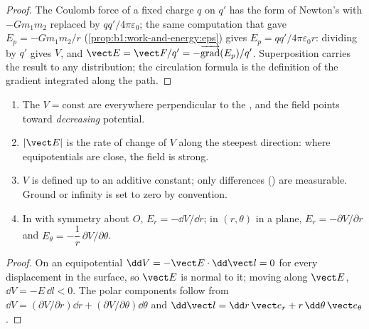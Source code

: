 \begin{proof}
The Coulomb force of a fixed charge $q$ on $q'$ has the form of Newton's
 with $-Gm_1m_2$ replaced by $qq'/4\pi\varepsilon_0$; the same
computation that gave $E_p = -Gm_1m_2/r$
(\cref{prop:b1:work-and-energy:eps}) gives $E_p = qq'/4\pi\varepsilon_0r$:
dividing by $q'$ gives $V$, and $\vect E = \vect F/q' =
-\overrightarrow{\operatorname{grad}}(E_p)/q'$. Superposition carries the
result to any distribution; the circulation formula is the definition
of the gradient integrated along the path.
\end{proof}

\begin{proposition}\label{prop:b1:potential-capacitors:reading}
\begin{enumerate}
  \item The \emph{} $V = \text{const}$ are
        everywhere perpendicular to the , and the field
        points toward \emph{decreasing} potential.
  \item $|\vect E|$ is the rate of change of $V$ along the steepest
        direction: where equipotentials are close, the field is strong.
  \item $V$ is defined up to an additive constant; only differences
        () are measurable. Ground or infinity is set to zero by
        convention.
  \item In  with symmetry about $O$, $E_r = -\dd V/
        \dd r$; in  $(r, \theta)$ in a plane,
        $E_r = -\partial V/\partial r$ and $E_\theta = -\dfrac1r\,\partial V/\partial\theta$.
\end{enumerate}
\end{proposition}

\begin{proof}
On an equipotential $\dd V = -\vect E\cdot\dd\vect l = 0$ for every
displacement in the surface, so $\vect E$ is normal to it; moving along
$\vect E$, $\dd V = -E\,\dd l < 0$. The polar components follow from
$\dd V = (\partial V/\partial r)\dd r + (\partial V/\partial\theta)\dd\theta$ and
$\dd\vect l = \dd r\,\vect e_r + r\,\dd\theta\,\vect e_\theta$.
\end{proof}

